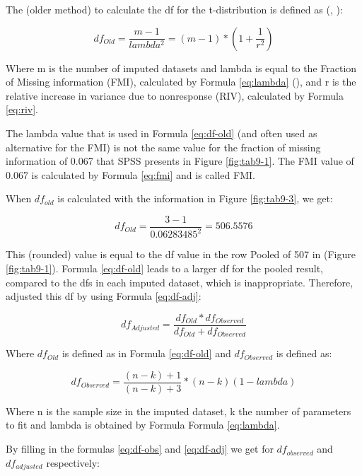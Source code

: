 \documentclass[
]{book}
\begin{document}
The (older method) to calculate the df for the t-distribution is defined as (\citet{Rubin1987}, \citet{VanBuuren2018}):

\begin{equation}
df_{Old} = \frac{m-1}{lambda^2} = (m-1) * (1 + \frac{1}{r^2})
  \label{eq:df-old}
\end{equation}

Where m is the number of imputed datasets and lambda is equal to the Fraction of Missing information (FMI), calculated by Formula \eqref{eq:lambda} (\citet{raghunathan2016}), and r is the relative increase in variance due to nonresponse (RIV), calculated by Formula \eqref{eq:riv}.

The lambda value that is used in Formula \eqref{eq:df-old} (and often used as alternative for the FMI) is not the same value for the fraction of missing information of 0.067 that SPSS presents in Figure \ref{fig:tab9-1}. The FMI value of 0.067 is calculated by Formula \eqref{eq:fmi} and is called FMI.

When \(df_{old}\) is calculated with the information in Figure \ref{fig:tab9-3}, we get:

\[df_{Old} = \frac{3-1}{0.06283485^2} = 506.5576\]

This (rounded) value is equal to the df value in the row Pooled of 507 in (Figure \ref{fig:tab9-1}). Formula \eqref{eq:df-old} leads to a larger df for the pooled result, compared to the dfs in each imputed dataset, which is inappropriate. Therefore, \citet{BARNARD1999} adjusted this df by using Formula \eqref{eq:df-adj}:

\begin{equation}
df_{Adjusted} = \frac{df_{Old}*{df_{Observed}}}{df_{Old}+{df_{Observed}}}
  \label{eq:df-adj}
\end{equation}

Where \(df_{Old}\) is defined as in Formula \eqref{eq:df-old} and \(df_{Observed}\) is defined as:

\begin{equation}
df_{Observed} = \frac{(n-k)+1}{(n-k)+3}*(n-k)(1-lambda)
  \label{eq:df-obs}
\end{equation}

Where n is the sample size in the imputed dataset, k the number of parameters to fit and lambda is obtained by Formula Formula \eqref{eq:lambda}.

By filling in the formulas \eqref{eq:df-obs} and \eqref{eq:df-adj} we get for \(df_{observed}\) and \(df_{adjusted}\) respectively:
\end{document}
